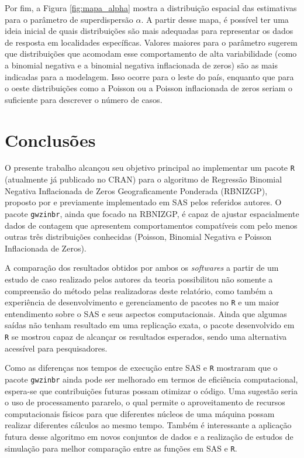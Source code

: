 \documentclass[12pt, a4paper, twoside]{report}
\numberwithin{equation}{section} %
\begin{document}
Por fim, a Figura \ref{fig:mapa_alpha} mostra a distribuição espacial das estimativas para o parâmetro de superdispersão $\alpha$. A partir desse mapa, é possível ter uma ideia inicial de quais distribuições são mais adequadas para representar os dados de resposta em localidades específicas. Valores maiores para o parâmetro sugerem que distribuições que acomodam esse comportamento de alta variabilidade (como a binomial negativa e a binomial negativa inflacionada de zeros) são as mais indicadas para a modelagem. Isso ocorre para o leste do país, enquanto que para o oeste distribuições como a Poisson ou a Poisson inflacionada de zeros seriam o suficiente para descrever o número de casos. 

\chapter{Conclusões}

O presente trabalho alcançou seu objetivo principal ao implementar um pacote \texttt{R} (atualmente já publicado no CRAN) para o algoritmo de Regressão Binomial Negativa Inflacionada de Zeros Geograficamente Ponderada (RBNIZGP), proposto por \cite{dasilva2023} e previamente implementado em SAS pelos referidos autores. O pacote \texttt{gwzinbr}, ainda que focado na RBNIZGP, é capaz de ajustar espacialmente dados de contagem que apresentem comportamentos compatíveis com pelo menos outras três distribuições conhecidas (Poisson, Binomial Negativa e Poisson Inflacionada de Zeros). 

A comparação dos resultados obtidos por ambos os \textit{softwares} a partir de um estudo de caso realizado pelos autores da teoria possibilitou não somente a compreensão do método pelas realizadoras deste relatório, como também a experiência de desenvolvimento e gerenciamento de pacotes no \texttt{R} e um maior entendimento sobre o SAS e seus aspectos computacionais. Ainda que algumas saídas não tenham resultado em uma replicação exata, o pacote desenvolvido em \texttt{R} se mostrou capaz de alcançar os resultados esperados, sendo uma alternativa acessível para pesquisadores.

Como as diferenças nos tempos de execução entre SAS e \texttt{R} mostraram que o pacote \texttt{gwzinbr} ainda pode ser melhorado em termos de eficiência computacional, espera-se que contribuições futuras possam otimizar o código. Uma sugestão seria o uso de processamento pararelo, o qual permite o aproveitamento de recursos computacionais físicos para que diferentes núcleos de uma máquina possam realizar diferentes cálculos ao mesmo tempo. Também é interessante a aplicação futura desse algoritmo em novos conjuntos de dados e a realização de estudos de simulação para melhor comparação entre as funções em SAS e \texttt{R}.


%


\end{document}

